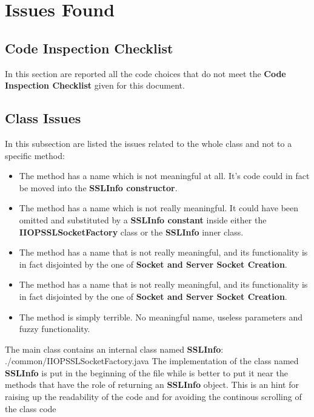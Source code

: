 \section{Issues Found}

\subsection{Code Inspection Checklist}
In this section are reported all the code choices that do not meet the \textbf{Code Inspection Checklist} given for this document.
\subsection{Class Issues}
In this subsection are listed the issues related to the whole class and not to a specific method:
\begin{itemize}
		\begin{itemize}
			\item
				The method
				has a name which is not meaningful at all.
				It's code could in fact be moved into the \textbf{SSLInfo constructor}.
			\item
				The method
				has a name which is not really meaningful.
				It could have been omitted and substituted by a \textbf{SSLInfo constant} inside either the \textbf{IIOPSSLSocketFactory} class or the \textbf{SSLInfo} inner class.
			\item
				The method
				has a name that is not really meaningful, and its functionality is in fact disjointed by the one of \textbf{Socket and Server Socket Creation}.
			\item
				The method 
				has a name that is not really meaningful, and its functionality is in fact disjointed by the one of \textbf{Socket and Server Socket Creation}.
			\item
				The method
				is simply terrible.
				No meaningful name, useless parameters and fuzzy functionality.
		\end{itemize}		
		The main class contains an internal class named \textbf{SSLInfo}:
		{./common/IIOPSSLSocketFactory.java}
		The implementation of the class named \textbf{SSLInfo} is put in the beginning of the file while is better to put it near the methods that have the role of returning an \textbf{SSLInfo} object.
		This is an hint for raising up the readability of the code and for avoiding the continous scrolling of the class code
\end{itemize}

